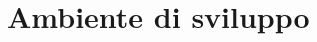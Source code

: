 \documentclass[../ManualeSviluppatore.tex]{subfiles}
\begin{document}
\section{Ambiente di sviluppo}
\end{document}
